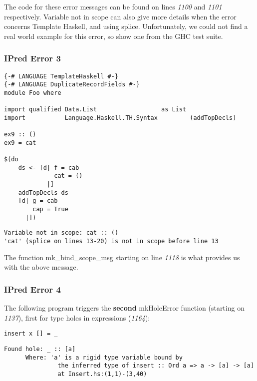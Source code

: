 \documentclass[a4paper]{article}
\begin{document}
The code for these error messages can be found on lines \textit{1100} and \textit{1101} respectively. Variable not in scope can also give more details when the error concerns Template Haskell, and using splice. Unfortunately, we could not find a real world example for this error, so show one from the GHC test suite.
\subsubsection{IPred Error 3}
\begin{lstlisting}[label={lst: T3.0}, numbers=none, caption={Example Program \cite{ex3}}]
{-# LANGUAGE TemplateHaskell #-}
{-# LANGUAGE DuplicateRecordFields #-}
module Foo where

import qualified Data.List                  as List
import           Language.Haskell.TH.Syntax         (addTopDecls)

ex9 :: ()
ex9 = cat

$(do
    ds <- [d| f = cab
              cat = ()
            |]
    addTopDecls ds
    [d| g = cab
        cap = True
      |])
\end{lstlisting}

\begin{lstlisting}[label={lst: T3.0.2}, numbers=none, caption={Error}]
Variable not in scope: cat :: ()
'cat' (splice on lines 13-20) is not in scope before line 13
\end{lstlisting}

The function mk\_bind\_scope\_msg starting on line \textit{1118} is what provides us with the above message.

\subsubsection{IPred Error 4}
The following program triggers the \textbf{second} mkHoleError function (starting on \textit{1137}), first for type holes in expressions (\textit{1164}):

\begin{lstlisting}[label={lst: T4.0}, numbers=none, caption={Example Program}]
insert x [] = _
\end{lstlisting}

\begin{lstlisting}[label={lst: T4.0.2}, numbers=none, caption={Error}]
 Found hole: _ :: [a]
      Where: 'a' is a rigid type variable bound by
               the inferred type of insert :: Ord a => a -> [a] -> [a]
               at Insert.hs:(1,1)-(3,40)
\end{lstlisting}
\end{document}
